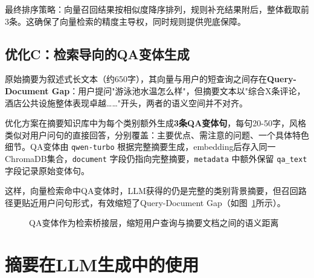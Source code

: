 \documentclass[11pt, a4paper]{article}
\begin{document}
最终排序策略：向量召回结果按相似度降序排列，规则补充结果附后，整体截取前3条。这确保了向量检索的精度主导权，同时规则提供兜底保障。

\subsection{优化C：检索导向的QA变体生成}

原始摘要为叙述式长文本（约650字），其向量与用户的短查询之间存在\textbf{Query-Document Gap}：用户提问"游泳池水温怎么样"，但摘要文本以"综合X条评论，酒店公共设施整体表现卓越……"开头，两者的语义空间并不对齐。

优化方案在摘要知识库中为每个类别额外生成\textbf{3条QA变体句}，每句20-50字，风格类似对用户问句的直接回答，分别覆盖：主要优点、需注意的问题、一个具体特色细节。QA变体由 \texttt{qwen-turbo} 根据完整摘要生成，embedding后存入同一ChromaDB集合，\texttt{document} 字段仍指向完整摘要，\texttt{metadata} 中额外保留 \texttt{qa\_text} 字段记录原始变体句。

这样，向量检索命中QA变体时，LLM获得的仍是完整的类别背景摘要，但召回路径更贴近用户问句形式，有效缩短了Query-Document Gap（如图~\ref{fig:qa}所示）。

\begin{figure}[H]
\centering
{}
\caption{QA变体作为检索桥接层，缩短用户查询与摘要文档之间的语义距离}
\label{fig:qa}
\end{figure}

\section{摘要在LLM生成中的使用}
\end{document}

